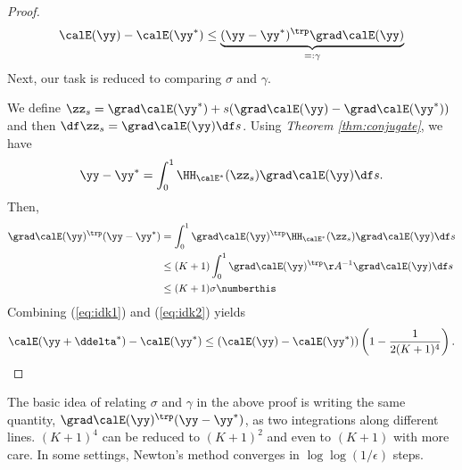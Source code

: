 \begin{proof}
\begin{align*}
    \calE(\yy)- \calE(\yy^*)
    \leq
    \underbrace{ (\yy-\yy^*)^\trp\grad\calE(\yy) }_{=:\gamma}
  \end{align*}
  Next, our task is reduced to comparing $\sigma$ and $\gamma$.
  
  We define $\zz_s = \grad\calE(\yy^*) + s(\grad\calE(\yy)-\grad\calE(\yy^*))$ and then $\df\zz_s = \grad\calE(\yy)\df s$.
  Using \emph{Theorem \ref{thm:conjugate}}, we have
  \[ \yy-\yy^* = \int_{0}^{1} \HH_{\calE^*}(\zz_s) \grad\calE(\yy) \df s.\]
  Then,
  \begin{align*}
    \grad\calE(\yy)^\trp(\yy-\yy^*)
    &= \int_{0}^{1} \grad\calE(\yy)^\trp \HH_{\calE^*}(\zz_s) \grad\calE(\yy) \df s \\
    &\leq (K+1)\int_{0}^{1} \grad\calE(\yy)^\trp \AA^{-1} \grad\calE(\yy) \df s \\
    &\leq (K+1)\sigma \numberthis \label{eq:idk2}
  \end{align*}
  Combining (\ref{eq:idk1}) and (\ref{eq:idk2}) yields
  \[ \calE(\yy+\ddelta^*)-\calE(\yy^*) \leq (\calE(\yy)-\calE(\yy^*))\left(1-\frac{1}{2(K+1)^4}\right). \]
\end{proof}

\begin{remark}
  The basic idea of relating $\sigma$ and $\gamma$ in the above proof is writing the same quantity, $\grad\calE(\yy)^\trp(\yy-\yy^*)$,  as two integrations along different lines.
  $(K+1)^4$ can be reduced to $(K+1)^2$ and even to $(K+1)$ with more care.
  In some settings, Newton's method converges in $\log\log(1/\epsilon)$ steps.
\end{remark}

